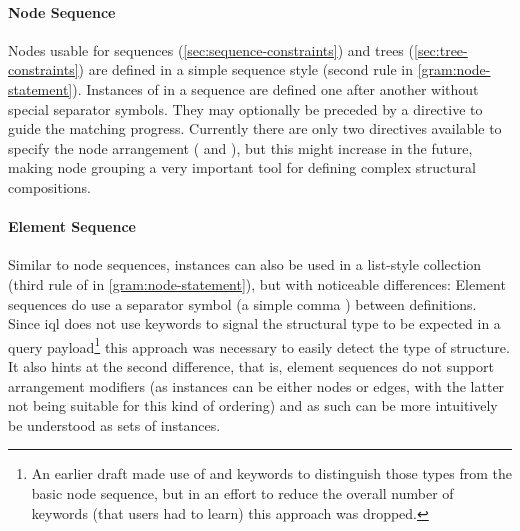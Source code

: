 \documentclass[11pt,a4paper]{article}
\begin{document}
\paragraph{Node Sequence}
\noindent Nodes usable for sequences (\ref{sec:sequence-constraints}) and trees (\ref{sec:tree-constraints}) are defined in a simple sequence style (second  rule in \cref{gram:node-statement}).
Instances of  in a sequence are defined one after another without special separator symbols.
They may optionally be preceded by a  directive to guide the matching progress.
Currently there are only two directives available to specify the node arrangement ( and ), but this might increase in the future, making node grouping a very important tool for defining complex structural compositions.

\paragraph{Element Sequence}
\noindent Similar to node sequences,  instances can also be used in a list-style collection (third rule of  in \cref{gram:node-statement}), but with noticeable differences: 
Element sequences do use a separator symbol (a simple comma \lit{,}) between  definitions.
Since \ac{iql} does not use keywords to signal the structural type to be expected in a query payload\footnote{An earlier draft made use of  and  keywords to distinguish those types from the basic node sequence, but in an effort to reduce the overall number of keywords (that users had to learn) this approach was dropped.} this approach was necessary to easily detect the type of structure.
It also hints at the second difference, that is, element sequences do not support arrangement modifiers (as  instances can be either nodes or edges, with the latter not being suitable for this kind of ordering) and as such can be more intuitively be understood as sets of  instances.
\end{document}
